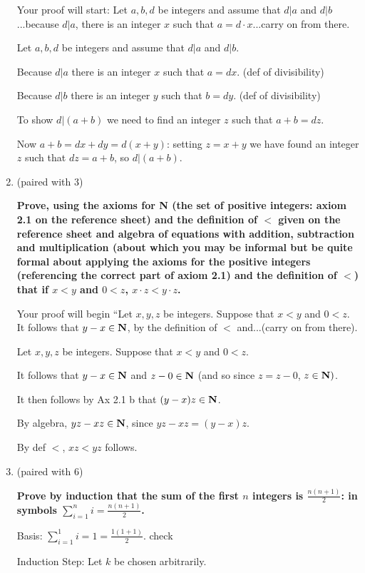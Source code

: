 \documentclass[12pt]{article}
\begin{document}
\begin{enumerate}
{Your proof will start:  Let $a,b,d$ be integers and assume that $d|a$ and $d|b$...because $d|a$, there is an integer $x$ such that $a=d\cdot x$...carry on from there.

Let $a,b,d$ be integers and assume that $d|a$ and $d|b$.  

Because $d|a$ there is an integer $x$ such that $a=dx$. (def of divisibility)

Because $d|b$ there is an integer $y$ such that $b=dy$. (def of divisibility)

To show $d|(a+b)$ we need to find an integer $z$ such that $a+b=dz$.

Now $a+b = dx+dy = d(x+y)$:  setting $z=x+y$ we have found an integer $z$ such that $dz=a+b$, so $d|(a+b)$.}



\item (paired with 3)  {\bf Prove, using the axioms for {\bf N} (the set of positive integers:  axiom 2.1 on the reference sheet) and the definition of $<$ given on the reference sheet and algebra of equations with addition, subtraction and multiplication (about which you may be informal but be quite formal about applying the axioms for the positive integers (referencing the correct part of axiom 2.1) and the definition of $<$) that if $x<y$ and $0<z$, $x\cdot z <y\cdot z$.

Your proof will begin ``Let $x,y,z$ be integers.  Suppose that $x<y$ and $0<z$.  It follows that $y-x \in {\bf N}$, by the definition of $<$  and...(carry on from there).

Let $x,y,z$ be integers.  Suppose that $x<y$ and $0<z$. 

It follows that $y-x \in {\bf N}$ and $z-0 \in {\bf N}$ (and so since $z=z-0$, $z \in {\bf N})$.

It then follows by Ax 2.1 b that $(y-x)z \in {\bf N}$.

By algebra, $yz -xz \in {\bf N}$, since $yz-xz = (y-x)z$.

By def $<$, $xz<yz$ follows.}



\item (paired with 6)  

{\bf Prove by induction that the sum of the first $n$ integers is $\frac{n(n+1)}2$:  in symbols $\sum_{i=1}^n i = \frac{n(n+1)}2$.

Basis:  $\sum_{i=1}^1 i = 1 = \frac{1(1+1)}2$. check

Induction Step:  Let $k$ be chosen arbitrarily.

}
\end{enumerate}
\end{document}

